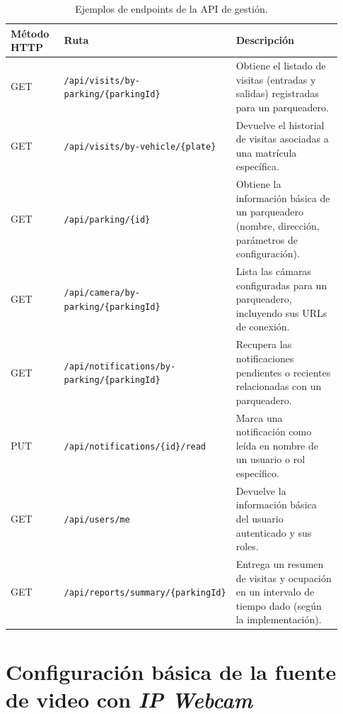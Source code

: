 \begin{table}[ht]
    \centering
    \caption{Ejemplos de endpoints de la API de gestión.}
    \label{tab:endpoints_api}
    \footnotesize
    \begin{tabular}{p{0.18\linewidth} p{0.35\linewidth} p{0.40\linewidth}}
        \hline
        \textbf{Método HTTP} & \textbf{Ruta} & \textbf{Descripción} \\
        \hline
        GET & \texttt{/api/visits/by-parking/\{parkingId\}} &
        Obtiene el listado de visitas (entradas y salidas) registradas para un parqueadero. \\[0.4em]

        GET & \texttt{/api/visits/by-vehicle/\{plate\}} &
        Devuelve el historial de visitas asociadas a una matrícula específica. \\[0.4em]

        GET & \texttt{/api/parking/\{id\}} &
        Obtiene la información básica de un parqueadero (nombre, dirección, parámetros de configuración). \\[0.4em]

        GET & \texttt{/api/camera/by-parking/\{parkingId\}} &
        Lista las cámaras configuradas para un parqueadero, incluyendo sus URLs de conexión. \\[0.4em]

        GET & \texttt{/api/notifications/by-parking/\{parkingId\}} &
        Recupera las notificaciones pendientes o recientes relacionadas con un parqueadero. \\[0.4em]

        PUT & \texttt{/api/notifications/\{id\}/read} &
        Marca una notificación como leída en nombre de un usuario o rol específico. \\[0.4em]

        GET & \texttt{/api/users/me} &
        Devuelve la información básica del usuario autenticado y sus roles. \\[0.4em]

        GET & \texttt{/api/reports/summary/\{parkingId\}} &
        Entrega un resumen de visitas y ocupación en un intervalo de tiempo dado (según la implementación). \\
        \hline
    \end{tabular}
\end{table}

\section{Configuración básica de la fuente de video con \textit{IP Webcam}}
\label{ap:ip_webcam}

